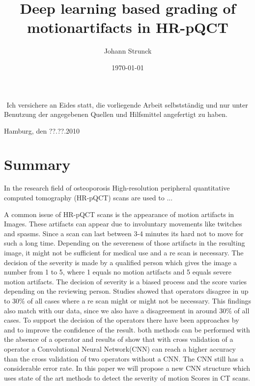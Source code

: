 \documentclass[
a4paper, 
12pt,
grayscalebody, %
abstract=on,
twoside, BCOR10mm, 12pt, DIV13,headinclude, footexclude, final, abstracton, openright
]{ibireprt}
\author{Johann Strunck}
\title{Deep learning based grading of motionartifacts in HR-pQCT}
\date{\today}
\numberwithin{equation}{chapter}
\numberwithin{table}{chapter}
\numberwithin{figure}{chapter}
\numberwithin{algorithm}{chapter}
\numberwithin{example}{chapter}
\numberwithin{example}{chapter}
\begin{document}
\maketitle


\newpage
${}^{}$
\vfill
\noindent
Ich versichere an Eides statt, die vorliegende Arbeit selbstständig und nur unter Benutzung der angegebenen Quellen und Hilfsmittel angefertigt zu haben.\\
\vspace{1.5cm}

\noindent
Hamburg, den ??.??.2010
\thispagestyle{empty}
\newpage
\newpage

\setlength{\parskip}{1.5mm }





\tableofcontents


\chapter*{Summary}
	In the research field of osteoporosis High-resolution peripheral quantitative computed tomography (HR-pQCT) scans are used to ...%
	
	
	A common issue of HR-pQCT scans is the appearance of motion artifacts in Images. These artifacts can appear due to involuntary movements like twitches and spasms. Since a scan can last between 3-4 minutes its hard not to move for such a long time. Depending on the severeness of those artifacts in the resulting image, it might not be sufficient for medical use and a re scan is necessary. The decision of the severity is made by a qualified person which gives the image a number from 1 to 5, where 1 equals no motion artifacts and 5 equals severe motion artifacts. The decision of severity is a  biased process and the score varies depending on the reviewing person. Studies showed that operators disagree in up to 30\% %
	of all cases where a re scan might or might not be necessary. This findings also match with our data, since we also have a disagreement in around 30\% of all cases. To support the decision of the operators there have been approaches by \cite{Sode2011} and \cite{Walle2023}  to improve the confidence of the result. both methods can be performed with the absence of a operator and results of \cite{Sode2011} show that with cross validation of a operator  a Convolutional Neural Network(CNN) can reach a higher accuracy than the cross validation of two operators without a CNN. The CNN still has a considerable error rate. In this paper we will propose a new CNN structure which uses state of the art methods to detect the severity of motion Scores in CT scans. %
\end{document}
